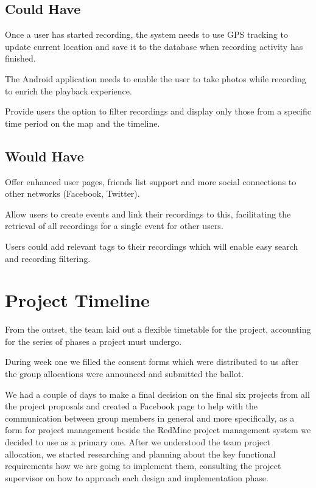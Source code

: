 \documentclass{l3proj}
\begin{document}
\subsection{Could Have}
	 Once a user has started recording, the system needs to use GPS tracking to update current location and save it to the database when recording activity has finished.

	 The Android application needs to enable the user to take photos while recording to enrich the playback experience.

	 Provide users the option to filter recordings and display only those from a specific time period on the map and the timeline.

\subsection{Would Have}
	 Offer enhanced user pages, friends list support and more social connections to other networks (Facebook, Twitter).

	 Allow users to create events and link their recordings to this, facilitating the retrieval of all recordings for a single event for other users.

	 Users could add relevant tags to their recordings which will enable easy search and recording filtering.


\section{Project Timeline}		From the outset, the team laid out a flexible timetable for the project, accounting for the series of phases a project must undergo.

During week one we filled the consent forms which were distributed to us after the group allocations were announced and submitted the ballot.

We had a couple of days to make a final decision on the final six projects from all the project proposals and created a Facebook page to help with the communication between group members in general and more specifically, as a form for project management beside the RedMine project management system we decided to use as a primary one.
After we understood the team project allocation, we started researching and planning about the key functional requirements how we are going to implement them, consulting the project supervisor on how to approach each design and implementation phase.
\end{document}
